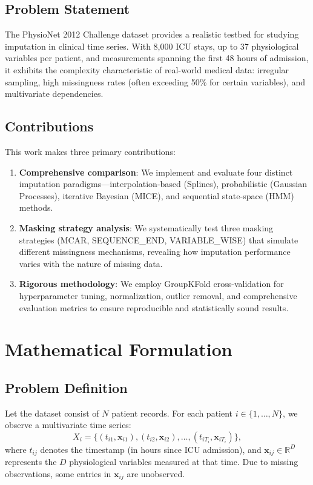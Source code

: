 \documentclass[11pt]{article}
\begin{document}
\subsection{Problem Statement}
The PhysioNet 2012 Challenge dataset provides a realistic testbed for studying imputation in clinical time series. With 8,000 ICU stays, up to 37 physiological variables per patient, and measurements spanning the first 48 hours of admission, it exhibits the complexity characteristic of real-world medical data: irregular sampling, high missingness rates (often exceeding 50\% for certain variables), and multivariate dependencies.

\subsection{Contributions}
This work makes three primary contributions:
\begin{enumerate}[noitemsep]
    \item \textbf{Comprehensive comparison}: We implement and evaluate four distinct imputation paradigms—interpolation-based (Splines), probabilistic (Gaussian Processes), iterative Bayesian (MICE), and sequential state-space (HMM) methods.
    \item \textbf{Masking strategy analysis}: We systematically test three masking strategies (MCAR, SEQUENCE\_END, VARIABLE\_WISE) that simulate different missingness mechanisms, revealing how imputation performance varies with the nature of missing data.
    \item \textbf{Rigorous methodology}: We employ GroupKFold cross-validation for hyperparameter tuning, normalization, outlier removal, and comprehensive evaluation metrics to ensure reproducible and statistically sound results.
\end{enumerate}

\section{Mathematical Formulation}

\subsection{Problem Definition}
Let the dataset consist of $N$ patient records. For each patient $i \in \{1, \ldots, N\}$, we observe a multivariate time series:
\begin{equation}
X_i = \{(t_{i1}, \mathbf{x}_{i1}), (t_{i2}, \mathbf{x}_{i2}), \ldots, (t_{iT_i}, \mathbf{x}_{iT_i})\},
\end{equation}
where $t_{ij}$ denotes the timestamp (in hours since ICU admission), and $\mathbf{x}_{ij} \in \mathbb{R}^D$ represents the $D$ physiological variables measured at that time. Due to missing observations, some entries in $\mathbf{x}_{ij}$ are unobserved.
\end{document}
